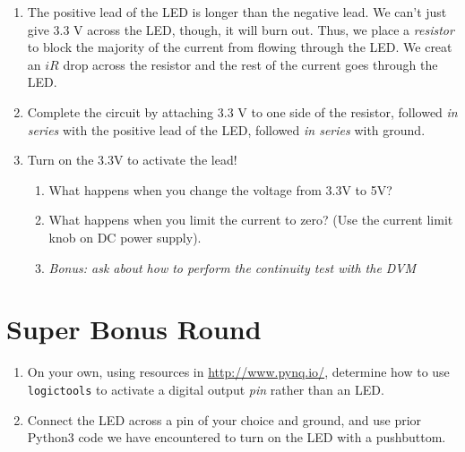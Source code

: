 \documentclass{article}
\begin{document}
\begin{enumerate}
\item The positive lead of the LED is longer than the negative lead.  We can't just give 3.3 V across the LED, though, it will burn out.  Thus, we place a \textit{resistor} to block the majority of the current from flowing through the LED.  We creat an $iR$ drop across the resistor and the rest of the current goes through the LED.
\item Complete the circuit by attaching 3.3 V to one side of the resistor, followed \textit{in series} with the positive lead of the LED, followed \textit{in series} with ground.
\item Turn on the 3.3V to activate the lead!
\begin{enumerate}
\item What happens when you change the voltage from 3.3V to 5V?
\item What happens when you limit the current to zero?  (Use the current limit knob on DC power supply).
\item \textit{Bonus: ask about how to perform the continuity test with the DVM}
\end{enumerate}
\end{enumerate}

\section{Super Bonus Round}

\begin{enumerate}
\item On your own, using resources in \url{http://www.pynq.io/}, determine how to use \verb+logictools+ to activate a digital output \textit{pin} rather than an LED.
\item Connect the LED across a pin of your choice and ground, and use prior Python3 code we have encountered to turn on the LED with a pushbuttom.
\end{enumerate}
\end{document}

